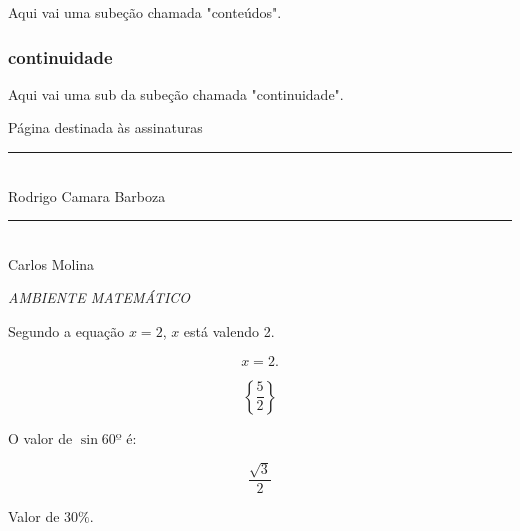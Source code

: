 \documentclass[12pt, a4paper]{article}
\begin{document}
Aqui vai uma subeção chamada "conteúdos".

\subsubsection{continuidade}

Aqui vai uma sub da subeção chamada "continuidade".

\newpage

\hrulefill
\begin{center}
\Large{Página destinada às assinaturas}
\end{center}

\hrulefill

\vspace{2cm}

\begin{center}
\rule{10cm}{0.02cm}\\
Rodrigo Camara Barboza
\end{center}

\vspace{1cm}

\begin{center}
\rule{10cm}{0.02cm}\\
Carlos Molina
\end{center}
\newpage

\hrulefill

\begin{center}
\Large{\textit{AMBIENTE MATEMÁTICO}}
\end{center}

\hrulefill

\vspace{0.5cm}

Segundo a equação $ x = 2 $, $x$ está valendo 2.

\begin{equation}
x = 2.
\end{equation}

\begin{equation}
\left\lbrace \frac{5}{2} \right\rbrace
\end{equation}

O valor de $\sin 60º$ é:

\begin{equation}
\frac{\sqrt{3}}{2}
\end{equation}

Valor de 30$\%$.
\end{document}
